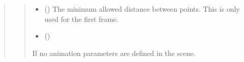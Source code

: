 \documentclass[letterpaper,10pt,english]{sphinxmanual}
\begin{document}
\begin{quote}
\begin{fulllineitems}
\begin{fulllineitems}
\begin{quote}
\begin{description}
\begin{itemize}
\item {} 
\sphinxAtStartPar
{} (\sphinxstyleliteralemphasis{\sphinxupquote{ | }}) \textendash{} The minimum allowed distance between points. This is only used for
the first frame.

\item {} 
\sphinxAtStartPar
{} (\sphinxstyleliteralemphasis{\sphinxupquote{{[}}}\sphinxstyleliteralemphasis{\sphinxupquote{, }}\sphinxstyleliteralemphasis{\sphinxupquote{{]}}})

\end{itemize}

\sphinxAtStartPar
{} \textendash{} If no animation parameters are defined in the scene.

\end{description}\end{quote}

\end{fulllineitems}


\end{fulllineitems}

\end{quote}


\renewcommand{\indexname}{Python Module Index}
\begin{sphinxtheindex}
\let\bigletter\sphinxstyleindexlettergroup
\bigletter{p}
\item\relax{}
\end{sphinxtheindex}

\renewcommand{\indexname}{Index}
\printindex
\end{document}
